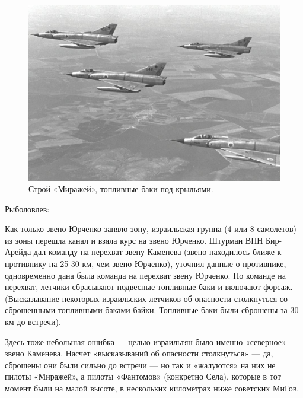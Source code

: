 \begin{figure}[h!tb] 
	\centering\includegraphics[scale=0.25]{Dolina_5/E47r1x-NUmM.jpg}
	\caption{Строй «Миражей», топливные баки под крыльями.}%
\end{figure}

Рыболовлев:

\begin{textcitation}
	Как только звено Юрченко заняло зону, израильская группа (4 или 8 самолетов) из зоны перешла канал и взяла курс на звено Юрченко. Штурман ВПН Бир-Арейда дал команду на перехват звену Каменева (звено находилось ближе к противнику на 25-30 км, чем звено Юрченко), уточнил данные о противнике, одновременно дана была команда на перехват звену Юрченко. По команде на перехват, летчики сбрасывают подвесные топливные баки и включают форсаж. (Высказывание некоторых израильских летчиков об опасности столкнуться со сброшенными топливными баками байки. Топливные баки были сброшены за 30 км до встречи).
\end{textcitation}

Здесь тоже небольшая ошибка — целью израильтян было именно «северное» звено Каменева. Насчет «высказываний об опасности столкнуться» — да, сброшены они были сильно до встречи — но так и «жалуются» на них не пилоты «Миражей», а пилоты «Фантомов» (конкретно Села), которые в тот момент были на малой высоте, в нескольких километрах ниже советских МиГов.

